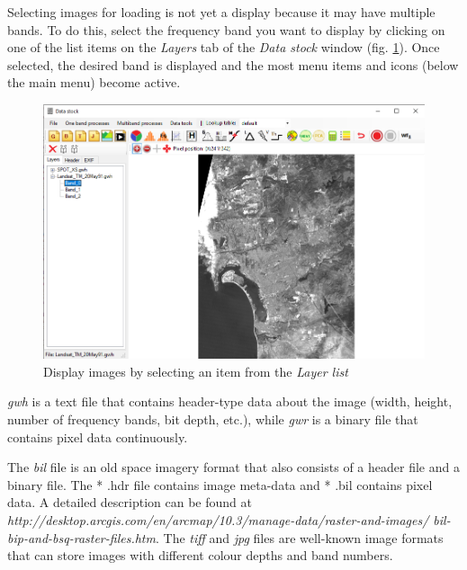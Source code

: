 \documentclass[a4paper,12pt]{article}
\begin{document}
Selecting images for loading is not yet a display because it may have multiple bands. To do this, select the frequency band you want to display by clicking on one of the list items on the \textit {Layers} tab of the  \textit {Data stock} window (fig. \ref {fig:layer_list}). Once selected, the desired band is displayed and the most menu items and icons (below the main menu) become active. 

\begin{figure}
	\centering
	\includegraphics[width=14cm]{layer_list.png}
	\caption{Display images by selecting an item from the \textit {Layer list} }
	\label{fig:layer_list}
\end{figure} 

\textit {gwh} is a text file that contains header-type data about the image (width, height, number of frequency bands, bit depth, etc.), while \textit {gwr} is a binary file that contains pixel data continuously.

The \textit {bil} file is an old space imagery format that also consists of a header file and a binary file. The * .hdr file contains image meta-data and * .bil contains pixel data. A detailed description can be found at \newline \textit {http://desktop.arcgis.com/en/arcmap/10.3/manage-data/raster-and-images/ bil-bip-and-bsq-raster-files.htm}. 
The \textit {tiff} and \textit{jpg} files are well-known image formats that can store images with different colour depths and band numbers. 
\end{document}

